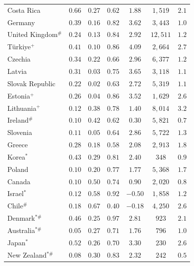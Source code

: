 \documentclass[12pt, a4paper]{article}
\begin{document}
\begin{table}[H]
\begin{tabular}{l ccc !{\vrule width 0.4pt} cc !{\vrule width 0.4pt} c}
Costa Rica              & $0.66$ & $0.27$ & $0.62$ & $1.88$  & $1{,}519$  & $2.1$ \\
Germany                 & $0.39$ & $0.16$ & $0.82$ & $3.62$  & $3{,}443$  & $1.0$ \\
United Kingdom\(^{\#}\) & $0.24$ & $0.13$ & $0.84$ & $2.92$  & $12{,}511$ & $1.2$ \\
T\"urkiye\(^{+}\)       & $0.41$ & $0.10$ & $0.86$ & $4.09$  & $2{,}664$  & $2.7$ \\
Czechia                 & $0.34$ & $0.22$ & $0.66$ & $2.96$  & $6{,}377$  & $1.2$ \\
Latvia                  & $0.31$ & $0.03$ & $0.75$ & $3.65$  & $3{,}118$  & $1.1$ \\
Slovak Republic         & $0.22$ & $0.02$ & $0.63$ & $2.72$  & $5{,}319$  & $1.1$ \\
Estonia\(^{+}\)         & $0.26$ & $0.04$ & $0.86$ & $3.52$  & $1{,}629$  & $2.6$ \\
Lithuania\(^{+}\)       & $0.12$ & $0.38$ & $0.78$ & $1.40$  & $8{,}014$  & $3.2$ \\
Ireland\(^{\#}\)        & $0.10$ & $0.42$ & $0.62$ & $0.30$  & $5{,}821$  & $0.7$ \\
Slovenia                & $0.11$ & $0.05$ & $0.64$ & $2.86$  & $5{,}722$  & $1.3$ \\
Greece                  & $0.28$ & $0.18$ & $0.58$ & $2.08$  & $2{,}913$  & $1.8$ \\
Korea\(^{*}\)           & $0.43$ & $0.29$ & $0.81$ & $2.40$  & $348$      & $0.9$ \\
Poland                  & $0.10$ & $0.20$ & $0.77$ & $1.77$  & $5{,}368$  & $1.7$ \\
Canada                  & $0.10$ & $0.50$ & $0.74$ & $0.90$  & $2{,}020$  & $0.8$ \\
Israel\(^{*}\)          & $0.12$ & $0.58$ & $0.92$ & $-0.50$ & $1{,}858$  & $1.2$ \\
Chile\(^{\#}\)          & $0.18$ & $0.67$ & $0.40$ & $-0.18$ & $4{,}250$  & $2.6$ \\
Denmark\(^{*\#}\)       & $0.46$ & $0.25$ & $0.97$ & $2.81$  & $923$      & $2.1$ \\
Australia\(^{*\#}\)     & $0.05$ & $0.27$ & $0.71$ & $1.76$  & $796$      & $1.0$ \\
Japan\(^{*}\)           & $0.52$ & $0.26$ & $0.70$ & $3.30$  & $230$      & $2.6$ \\
New Zealand\(^{*\#}\)   & $0.08$ & $0.30$ & $0.83$ & $2.32$  & $242$      & $0.5$ \\

\end{tabular}
\end{table}
\end{document}
